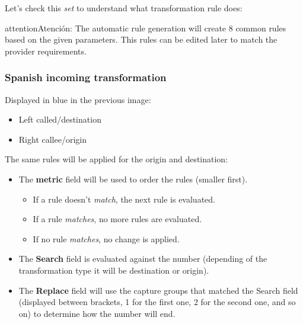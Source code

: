 \documentclass[letterpaper,10pt,spanish]{sphinxmanual}
\begin{document}
Let's check this \emph{set} to understand what transformation rule does:

\begin{notice}{attention}{Atención:}
The automatic rule generation will create 8 common rules based on
the given parameters. This rules can be edited later to match the provider
requirements.
\end{notice}


\subsubsection{Spanish incoming transformation}
\label{administration_portal/brand/settings/numeric_transformations:spanish-incoming-transformation}
Displayed in blue in the previous image:
\begin{itemize}
\item {} 
Left called/destination

\item {} 
Right callee/origin

\end{itemize}

The same rules will be applied for the origin and destination:
\begin{itemize}
\item {} 
The \textbf{metric} field will be used to order the rules (smaller first).
\begin{itemize}
\item {} 
If a rule doesn't \emph{match}, the next rule is evaluated.

\item {} 
If a rule \emph{matches}, no more rules are evaluated.

\item {} 
If no rule \emph{matches}, no change is applied.

\end{itemize}

\item {} 
The \textbf{Search} field is evaluated against the number (depending of the
transformation type it will be destination or origin).

\item {} 
The \textbf{Replace} field will use the capture groups that matched the Search
field (displayed between brackets, 1 for the first one, 2 for the second
one, and so on) to determine how the number will end.

\end{itemize}
\end{document}
